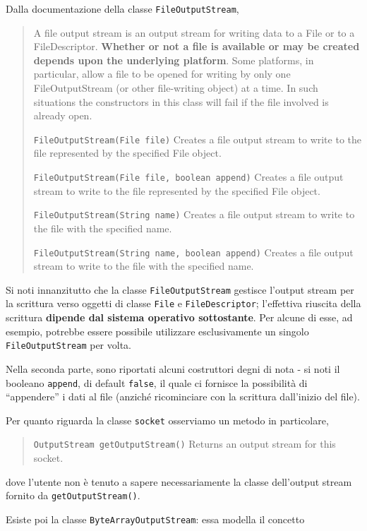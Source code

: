 \documentclass[\fontsizeclass,twocolumn]{\classname}
\theoremstyle{definition}
\theoremstyle{definition}
\begin{document}
Dalla documentazione della classe \texttt{FileOutputStream},
\begin{quote}
    \footnotesize{A file output stream is an output stream for writing data to
    a File or to a FileDescriptor. \textbf{Whether or not a file is available or may be
    created depends upon the underlying platform}. Some platforms, in particular,
allow a file to be opened for writing by only one FileOutputStream (or other
file-writing object) at a time. In such situations the constructors in this
class will fail if the file involved is already open.

\texttt{FileOutputStream(File file)} 	Creates a file output stream to write to the file represented by the specified File object.

\texttt{FileOutputStream(File file, boolean append)} 	Creates a file output stream to write to the file represented by the specified File object.

\texttt{FileOutputStream(String name)} 	Creates a file output stream to write to the file with the specified name.

\texttt{FileOutputStream(String name, boolean append)} 	Creates a file output stream to write to the file with the specified name.
}
\end{quote}

Si noti innanzitutto che la classe \texttt{FileOutputStream} gestisce l'output
stream per la scrittura verso oggetti di classe \texttt{File} e
\texttt{FileDescriptor}; l'effettiva riuscita della scrittura \textbf{dipende
dal sistema operativo sottostante}. Per alcune di esse, ad esempio, potrebbe
essere possibile utilizzare esclusivamente un singolo \texttt{FileOutputStream}
per volta.

Nella seconda parte, sono riportati alcuni costruttori degni di nota \-- si
noti il booleano \texttt{append}, di default \texttt{false}, il quale ci
fornisce la possibilità di ``appendere'' i dati al file (anziché ricominciare
con la scrittura dall'inizio del file).

Per quanto riguarda la classe \texttt{socket} osserviamo un metodo in
particolare,
\begin{quote}
    \footnotesize{\texttt{OutputStream 	getOutputStream()}	Returns an output
    stream for this socket.}
\end{quote}
dove l'utente non è tenuto a sapere necessariamente la classe dell'output
stream fornito da \texttt{getOutputStream()}.

Esiste poi la classe \texttt{ByteArrayOutputStream}: essa modella il concetto
\end{document}
